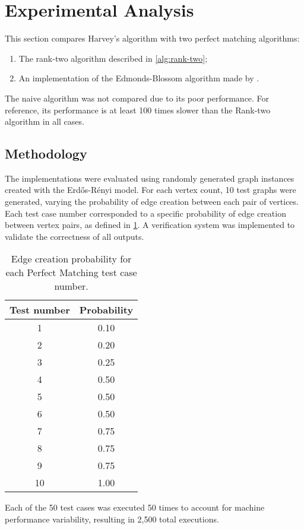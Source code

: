 \section{Experimental Analysis}
\label{Harvey:analysis}
\noindent
This section compares Harvey's algorithm with two perfect matching algorithms:
\begin{enumerate}
   \item The rank-two algorithm described in \cref{alg:rank-two};
   \item An implementation of the Edmonds-Blossom algorithm made by \citet{giovana:blossom}.
\end{enumerate}
\noindent
The naive algorithm was not compared due to its poor performance.
For reference, its performance is at least 100 times slower than the Rank-two algorithm in all cases.

\subsection{Methodology}

The implementations were evaluated using randomly generated graph instances created with the Erd\H{o}s-R\'enyi model. 
For each vertex count, 10 test graphs were generated, varying the probability of edge creation between each pair of vertices. 
Each test case number corresponded to a specific probability of edge creation between vertex pairs, as defined in \cref{tab:edge_perf}. 
A verification system was implemented to validate the correctness of all outputs.
\begin{table}[H]
  \centering
  \begin{tabular}{|c|c|}
    \hline
    Test number & Probability \\
    \hline
    1 & 0.10 \\
    2 & 0.20 \\
    3 & 0.25 \\
    4 & 0.50 \\
    5 & 0.50 \\
    6 & 0.50 \\
    7 & 0.75 \\
    8 & 0.75 \\
    9 & 0.75 \\
    10 & 1.00 \\
    \hline
  \end{tabular}
  \caption{Edge creation probability for each Perfect Matching test case number.}
  \label{tab:edge_perf}
\end{table}
Each of the 50 test cases was executed 50 times to account for machine performance variability, resulting in 2,500 total executions.


